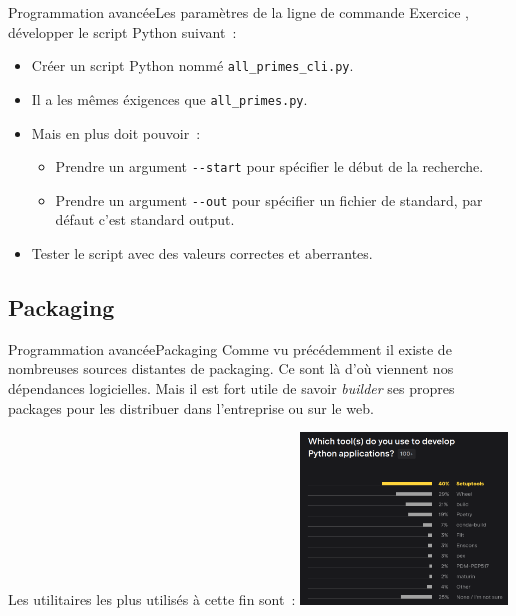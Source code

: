 \documentclass{beamer}
\begin{document}
    \begin{frame}{Programmation avancée}{Les paramètres de la ligne de commande}
        Exercice \execcounterdispinc{}, développer le script Python suivant~:
        \begin{itemize}
            \item Créer un script Python nommé \lstinline{all_primes_cli.py}.
            \item Il a les mêmes éxigences que \lstinline{all_primes.py}.
            \item Mais en plus doit pouvoir~:
            \begin{itemize}
                \item Prendre un argument \lstinline{--start} pour spécifier le début de la recherche.
                \item Prendre un argument \lstinline{--out} pour spécifier un fichier de standard, par défaut c'est standard output.
            \end{itemize}
            \item Tester le script avec des valeurs correctes et aberrantes.
        \end{itemize}
    \end{frame}

    \subsection{Packaging}\label{subsec:packaging}

    \begin{frame}{Programmation avancée}{Packaging}
        Comme vu précédemment il existe de nombreuses sources distantes de packaging.
        Ce sont là d'où viennent nos dépendances logicielles.
        \bigbreak
        Mais il est fort utile de savoir \textit{builder} ses propres packages pour les distribuer dans l'entreprise ou sur le web.

        Les utilitaires les plus utilisés à cette fin sont~:
        \bigbreak
        \centering
        \includegraphics[width=5.5cm]{image/survey_packaging_lib}
    \end{frame}
\end{document}
